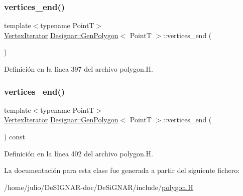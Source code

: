 \subsubsection{\texorpdfstring{vertices\+\_\+end()}{vertices\_end()}\hspace{0.1cm}{\footnotesize\ttfamily [1/2]}}
{\footnotesize\ttfamily template$<$typename PointT$>$ \\
\hyperlink{class_designar_1_1_gen_polygon_1_1_vertex_iterator}{Vertex\+Iterator} \hyperlink{class_designar_1_1_gen_polygon}{Designar\+::\+Gen\+Polygon}$<$ PointT $>$\+::vertices\+\_\+end (\begin{DoxyParamCaption}{ }\end{DoxyParamCaption})\hspace{0.3cm}{\ttfamily [inline]}}



Definición en la línea 397 del archivo polygon.\+H.

\mbox{\label{class_designar_1_1_gen_polygon_ad409613d032d91895921d60e27250a14}} 
\subsubsection{\texorpdfstring{vertices\+\_\+end()}{vertices\_end()}\hspace{0.1cm}{\footnotesize\ttfamily [2/2]}}
{\footnotesize\ttfamily template$<$typename PointT$>$ \\
\hyperlink{class_designar_1_1_gen_polygon_1_1_vertex_iterator}{Vertex\+Iterator} \hyperlink{class_designar_1_1_gen_polygon}{Designar\+::\+Gen\+Polygon}$<$ PointT $>$\+::vertices\+\_\+end (\begin{DoxyParamCaption}{ }\end{DoxyParamCaption}) const\hspace{0.3cm}{\ttfamily [inline]}}



Definición en la línea 402 del archivo polygon.\+H.



La documentación para esta clase fue generada a partir del siguiente fichero\+:\begin{DoxyCompactItemize}
\item 
/home/julio/\+De\+S\+I\+G\+N\+A\+R-\/doc/\+De\+Si\+G\+N\+A\+R/include/\hyperlink{polygon_8_h}{polygon.\+H}\end{DoxyCompactItemize}
